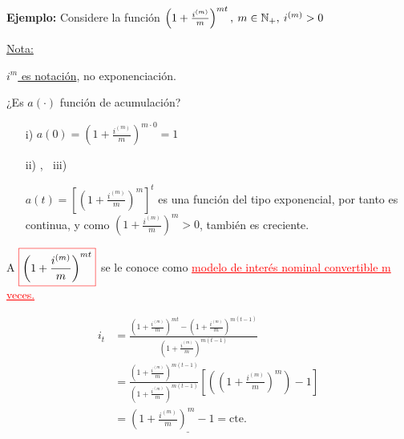 \textbf{Ejemplo:} Considere la función $\left( 1 + \frac{i^{(m)}}{m}\right)^{mt}, \: m\in \mathbb N_+, \: i^{(m)}>0$

\underline{Nota:}

\underline{$i^{m}$ es notación}, no exponenciación.

¿Es $a(\cdot)$ función de acumulación?
\begin{enumerate}
\item[i)] $a(0)=\left( 1 + \frac{i^{(m)}}{m}\right)^{m\cdot 0} = 1 $
\item[ii)], $\:$ iii)

$a(t) =\left[ \left( 1 +\frac{i^{(m)}}{m}\right)^{m}\right]^t$ es una función del tipo exponencial, por tanto es continua, y como  $\left( 1 +\frac{i^{(m)}}{m}\right)^{m} > 0$, también es creciente.
\end{enumerate}
A $\color{red}\boxed{\color{black}\left( 1 + \frac{i^{(m)}}{m}\right)^{mt}}$ se le conoce como \textcolor{red}{\underline{modelo de interés nominal convertible m veces.} }
\bigskip
\begin{center}
\end{center}
\begin{align*}
i_t &= \frac{\left( 1 + \frac{i^{(m)}}{m}\right)^{mt}-\left( 1 + \frac{i^{(m)}}{m}\right)^{m(t-1)}}{\left( 1 + \frac{i^{(m)}}{m}\right)^{m(t-1)}} \\
&= \frac{\left( 1 + \frac{i^{(m)}}{m}\right)^{m(t-1)}}{\left( 1 + \frac{i^{(m)}}{m}\right)^{m(t-1)}}\left[\left(\left( 1 + \frac{i^{(m)}}{m}\right)^{m} \right) - 1 \right] \\
&= \underline{\left( 1 + \frac{i^{(m)}}{m}\right)^{m} - 1 = \text{cte.}}
\end{align*}

